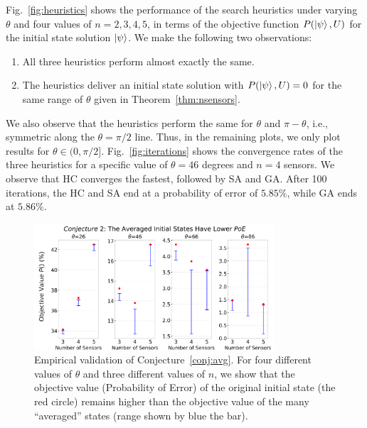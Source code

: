 





Fig.~\ref{fig:heuristics} shows the performance of the search heuristics
under varying $\theta$ and four values of $n = 2, 3, 4, 5$, in terms of the \iso objective function $P(\ket{\psi}, U)$ for the initial state solution $\ket{\psi}$. We make the following two observations:
\begin{enumerate}
    \item All three heuristics perform almost exactly the same.
    \item The heuristics deliver an initial state solution with $P(\ket{\psi}, U) = 0$ for the same range of $\theta$ given in Theorem~\ref{thm:nsensors}.
\end{enumerate}
We also observe that the heuristics perform the same for $\theta$ and $\pi - \theta$,
i.e., symmetric along the $\theta=\pi/2$ line. Thus, in the remaining plots, we only plot
results for $\theta \in (0, \pi/2]$.
Fig.~\ref{fig:iterations} shows the convergence rates of the three heuristics for a specific value of $\theta=46$ degrees and $n=4$ sensors. 
We observe that HC converges the fastest, followed by SA and GA.
After 100 iterations, the HC and SA end at a probability of error of $5.85\%$, while GA ends at $5.86\%$.



\begin{figure}
    \centering
    \includegraphics[width=0.8\textwidth]{chapters/tqc/figures/lemma2.png}
    \caption{Empirical validation of Conjecture~\ref{conj:avg}. For four different values of $\theta$ and three different values of $n$, we show that
    the objective value (Probability of Error) of the original initial state (the red circle) remains higher than the objective value of the many ``averaged'' states (range shown by blue the bar).}
    \label{fig:lemma2}
\end{figure}



